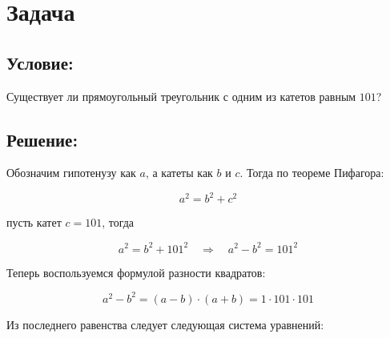 \section{Задача}

\subsection*{Условие:}
Существует ли прямоугольный треугольник с одним из катетов равным $101$?

\subsection*{Решение:}
Обозначим гипотенузу как $a$, а катеты как $b$ и $c$. Тогда по теореме Пифагора:

$$
    a^2 = b^2 + c^2
$$

\noindent пусть катет $c = 101$, тогда

$$
    a^2 = b^2 + 101^2 \quad \Rightarrow \quad a^2 - b^2 = 101^2
$$

Теперь воспользуемся формулой разности квадратов:

$$
    a^2 - b^2 = (a - b)\cdot(a + b) = 1 \cdot 101 \cdot 101
$$

Из последнего равенства следует следующая система уравнений:

